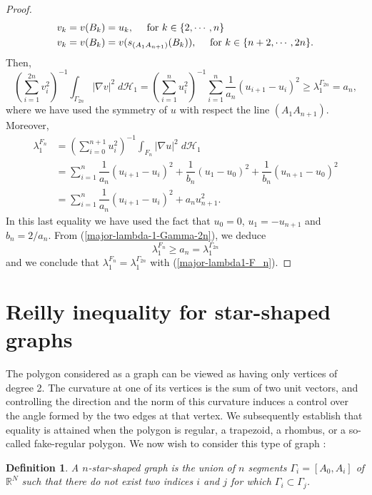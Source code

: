 \documentclass[12pt,english]{smfart} %
\newtheorem{definition}[theorem]{Definition}
\theoremstyle{remark}
\begin{document}
\begin{proof}
\begin{align*}
    v_k&=v(B_k)=u_k, \quad \textnormal{ for }k\in\{2,\cdots,n\}\\
    v_k&=v(B_k)=v(s_{(A_1A_{n+1})}(B_k)), \quad \textnormal{ for }k\in\{n+2,\cdots,2n\}.
\end{align*}
Then,
\begin{equation}\label{major-lambda-1-Gamma-2n}
\left(\sum_{i=1}^{2n}v_i^2\right)^{-1}\displaystyle\int_{\Gamma_{2n}}|\nabla v|^2\;d\mathcal{H}_1=\left( \sum_{i=1}^nu_i^2\right)^{-1}\sum_{i=1}^n\dfrac{1}{a_n}(u_{i+1}-u_i)^2\geqslant\lambda_1^{\Gamma_{2n}}=a_n,
\end{equation}
where we have used the symmetry of $u$ with respect the line $(A_1A_{n+1})$. Moreover,
\begin{align*}
\lambda_1^{F_n}&=\left( \sum_{i=0}^{n+1}u_i^2\right)^{-1}\int_{F_n}|\nabla u|^2\;d\mathcal{H}_1\\
&=\sum_{i=1}^n\dfrac{1}{a_n}(u_{i+1}-u_i)^2+\dfrac{1}{b_n}(u_1-u_0)^2+\dfrac{1}{b_n}(u_{n+1}-u_0)^2\\
&=\displaystyle\sum_{i=1}^n\dfrac{1}{a_n}(u_{i+1}-u_i)^2+a_nu_{n+1}^2. \end{align*}
In this last equality we have used the fact that $u_0=0$, $u_1=-u_{n+1}$ and $b_n=2/a_n$. From (\ref{major-lambda-1-Gamma-2n}), we deduce 
$$\lambda_1^{F_n}\geqslant a_n=\lambda_1^{\Gamma_{2n}}$$
and we conclude that $\lambda_1^{F_n}=\lambda_1^{\Gamma_{2n}}$ with (\ref{major-lambda1-F_n}).
\end{proof} 


\section{Reilly inequality for star-shaped graphs}
\label{graph}
The polygon considered as a graph can be viewed as having only vertices of degree 2. The curvature at one of its vertices is the sum of two unit vectors, and controlling the direction and the norm of this curvature induces a control over the angle formed by the two edges at that vertex. We subsequently establish that equality is attained when the polygon is regular, a trapezoid, a rhombus, or a so-called fake-regular polygon. We now wish to consider this type of graph :\newline

\begin{definition}
	A $n$-star-shaped graph is the union of $n$ segments $\Gamma_i = [A_0,A_i]$ of $\mathbb{R}^N$ such that there do not exist two indices $i$ and $j$ for which $\Gamma_i \subset \Gamma_j$.
\end{definition}
\end{document}
